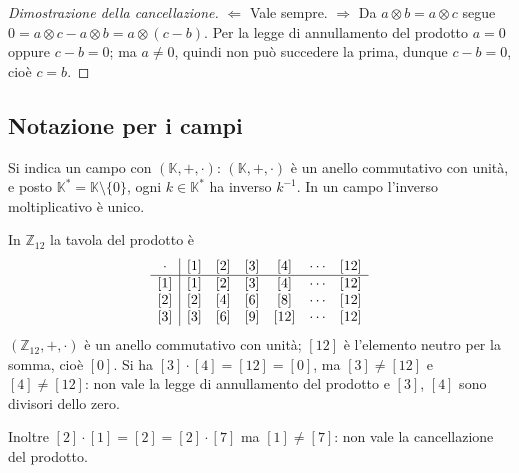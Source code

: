 \documentclass[11pt,a4paper]{article}
\begin{document}
\begin{proof}[Dimostrazione della cancellazione]
$\Leftarrow$ Vale sempre. $\Rightarrow$ Da $a \otimes b = a \otimes c$ segue $0 = a \otimes c - a \otimes b = a \otimes (c - b)$. Per la legge di annullamento del prodotto $a = 0$ oppure $c - b = 0$; ma $a \neq 0$, quindi non può succedere la prima, dunque $c - b = 0$, cioè $c = b$.
\end{proof}

\subsection{Notazione per i campi}

Si indica un campo con $(\mathbb{K}, +, \cdot)$: $(\mathbb{K}, +, \cdot)$ è un anello commutativo con unità, e posto $\mathbb{K}^* = \mathbb{K}\setminus\{0\}$, ogni $k \in \mathbb{K}^*$ ha inverso $k^{-1}$. In un campo l'inverso moltiplicativo è unico.

\begin{esempio}
In $\mathbb{Z}_{12}$ la tavola del prodotto è
\[
\begin{array}{c|cccccc}
  \cdot & [1] & [2] & [3] & [4] & \cdots & [12] \\ \hline
  \relax[1] & [1] & [2] & [3] & [4] & \cdots & [12] \\
  \relax[2] & [2] & [4] & [6] & [8] & \cdots & [12] \\
  \relax[3] & [3] & [6] & [9] & [12] & \cdots & [12]
\end{array}
\]
$(\mathbb{Z}_{12}, +, \cdot)$ è un anello commutativo con unità; $[12]$ è l'elemento neutro per la somma, cioè $[0]$. Si ha $[3]\cdot[4] = [12] = [0]$, ma $[3] \neq [12]$ e $[4] \neq [12]$: non vale la legge di annullamento del prodotto e $[3]$, $[4]$ sono divisori dello zero.

Inoltre $[2]\cdot[1] = [2] = [2]\cdot[7]$ ma $[1] \neq [7]$: non vale la cancellazione del prodotto.
\end{esempio}
\end{document}
